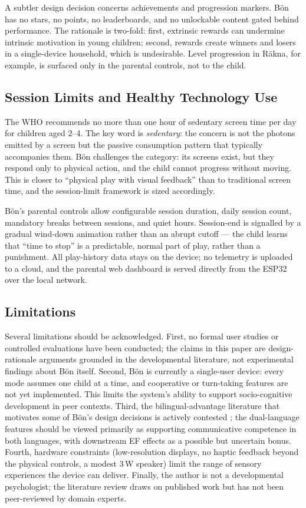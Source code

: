 \documentclass[12pt, a4paper]{article}
\newcommand{\Bodn}{B\"o\dh{}n}
\begin{document}
A subtler design decision concerns achievements and progression markers.
\Bodn{} has no stars, no points, no leaderboards, and no unlockable content
gated behind performance. The rationale is two-fold: first, extrinsic rewards
can undermine intrinsic motivation in young children; second, rewards create
winners and losers in a single-device household, which is undesirable. Level
progression in R\"akna, for example, is surfaced only in the parental
controls, not to the child.

\subsection{Session Limits and Healthy Technology Use}

The WHO \citep{who2019guidelines} recommends no more than one hour of sedentary
screen time per day for children aged 2--4. The key word is \emph{sedentary}:
the concern is not the photons emitted by a screen but the passive consumption
pattern that typically accompanies them. \Bodn{} challenges the category: its
screens exist, but they respond only to physical action, and the child cannot
progress without moving. This is closer to ``physical play with visual
feedback'' than to traditional screen time, and the session-limit framework is
sized accordingly.

\Bodn{}'s parental controls allow configurable session duration, daily session
count, mandatory breaks between sessions, and quiet hours. Session-end is
signalled by a gradual wind-down animation rather than an abrupt cutoff ---
the child learns that ``time to stop'' is a predictable, normal part of play,
rather than a punishment. All play-history data stays on the device; no
telemetry is uploaded to a cloud, and the parental web dashboard is served
directly from the ESP32 over the local network.

\subsection{Limitations}

Several limitations should be acknowledged. First, no formal user studies or
controlled evaluations have been conducted; the claims in this paper are
design-rationale arguments grounded in the developmental literature, not
experimental findings about \Bodn{} itself. Second, \Bodn{} is currently a
single-user device: every mode assumes one child at a time, and cooperative
or turn-taking features are not yet implemented. This limits the system's
ability to support socio-cognitive development in peer contexts. Third, the
bilingual-advantage literature that motivates some of \Bodn{}'s design
decisions is actively contested
\citep{paap2015bilingualism, lehtonen2018bilingualism}; the dual-language
features should be viewed primarily as supporting communicative competence in
both languages, with downstream EF effects as a possible but uncertain
bonus. Fourth, hardware constraints (low-resolution displays, no haptic
feedback beyond the physical controls, a modest 3\,W speaker) limit the
range of sensory experiences the device can deliver. Finally, the author is
not a developmental psychologist; the literature review draws on published
work but has not been peer-reviewed by domain experts.
\end{document}
